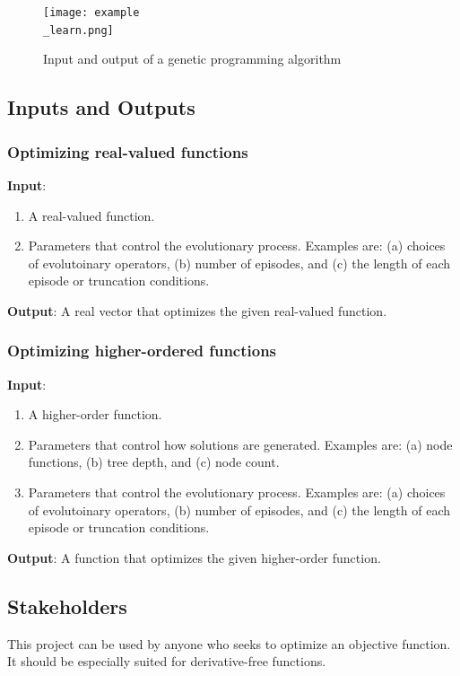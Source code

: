 \documentclass{article}
\begin{document}
\begin{figure}[h]
    \caption{Input and output of a genetic programming algorithm}
    \texttt{[image: example\\\_learn.png]}
    \centering
\end{figure}

\subsection{Inputs and Outputs}


\subsubsection{Optimizing real-valued functions}
\textbf{Input}:
\begin{enumerate}
    \item A real-valued function.
    \item Parameters that control the evolutionary process. Examples are: (a) choices of evolutoinary operators, (b) number of episodes, and (c) the length of each episode or truncation conditions.
\end{enumerate}
\textbf{Output}: A real vector that optimizes the given real-valued function.

\subsubsection{Optimizing higher-ordered functions}
\textbf{Input}:
\begin{enumerate}
    \item A higher-order function.
    \item Parameters that control how solutions are generated. Examples are: (a) node functions, (b) tree depth, and (c) node count.
    \item Parameters that control the evolutionary process. Examples are: (a) choices of evolutoinary operators, (b) number of episodes, and (c) the length of each episode or truncation conditions.
\end{enumerate}
\textbf{Output}: A function that optimizes the given higher-order function.

\subsection{Stakeholders}
This project can be used by anyone who seeks to optimize an objective function. It should be especially suited for derivative-free functions.
\end{document}
